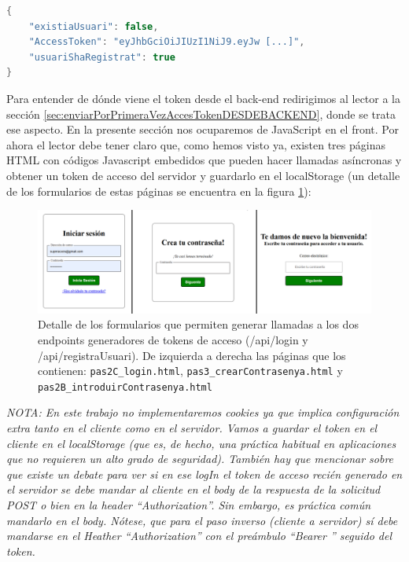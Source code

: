 \documentclass[a4paper,12pt]{report}
\begin{document}
	
	
\begin{lstlisting}[language=Java, basicstyle=\ttfamily\footnotesize, keywordstyle=\color{magenta}]
{
	"existiaUsuari": false,
	"AccessToken": "eyJhbGciOiJIUzI1NiJ9.eyJw [...]",
	"usuariShaRegistrat": true
}
\end{lstlisting}
	
	
	Para entender de dónde viene el token desde el back-end redirigimos al lector a la sección \ref{sec:enviarPorPrimeraVezAccesTokenDESDEBACKEND}, donde se trata ese aspecto. En la presente sección nos ocuparemos de JavaScript en el front. Por ahora el lector debe tener claro que, como hemos visto ya, existen tres páginas HTML con códigos Javascript embedidos que pueden hacer llamadas asíncronas y obtener un token de acceso del servidor y guardarlo en el localStorage (un detalle de los formularios de estas páginas se encuentra en la figura \ref{fig:figPaginesQueExpedeixenJWT}):
	
	\setlength{\belowcaptionskip}{3pt}
	\FloatBarrier
	\begin{figure}[H]
		\centering
		\caption{Detalle de los formularios que permiten generar llamadas a los dos endpoints generadores de tokens de acceso (/api/login y /api/registraUsuari). De izquierda a derecha las páginas que los contienen: \texttt{pas2C\_login.html}, \texttt{pas3\_crearContrasenya.html} y \texttt{pas2B\_introduirContrasenya.html}}
		\includegraphics[width=1\textwidth]{img/figPaginesQueExpedeixenJWT.png}
		
		\label{fig:figPaginesQueExpedeixenJWT} 
	\end{figure}
	\FloatBarrier
	
	
	
\textit{NOTA: En este trabajo no implementaremos cookies ya que implica configuración extra tanto en el cliente como en el servidor. Vamos a guardar el token en el cliente en el localStorage (que es, de hecho, una práctica habitual en aplicaciones que no requieren un alto grado de seguridad). También hay que mencionar sobre que existe un debate para ver si en ese logIn el token de acceso recién generado en el servidor se debe mandar al cliente en el body de la respuesta de la solicitud POST \textit{o bien} en la header ``Authorization''. Sin embargo, es práctica común mandarlo en el body. Nótese, que para el paso inverso (cliente a servidor) sí debe mandarse en el Heather ``Authorization'' con el preámbulo ``Bearer '' seguido del token. }
	
\end{document}
